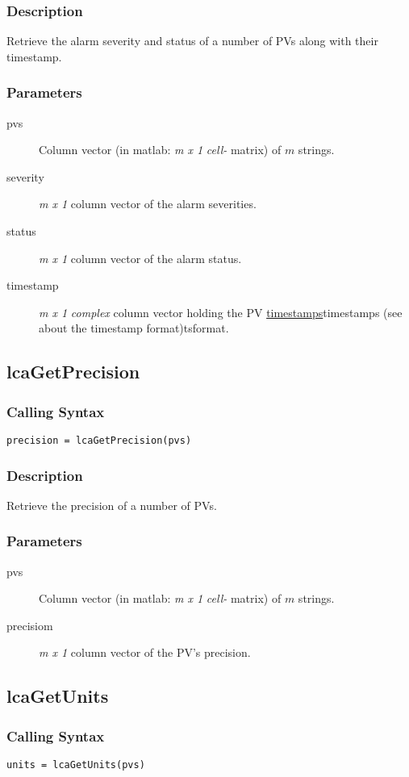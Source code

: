 \documentclass{article}
\newcommand{\pbrk}{\pagebreak[3]}
\newcommand{\ita}[1]{\emph{#1}}
\newcommand{\m}{$m$}
\newcommand{\mhack}{$m$} %
\newcommand{\mxl}{$m\times 1$}
\renewcommand{\m}{\ita{m}}
\newcommand{\mhack}{\ita{m}} %
\renewcommand{\mxl}{\ita{m x 1}}
\renewcommand{\pbrk}{}
\newcommand{\PVITEM}{
\item[pvs] Column vector (in matlab: \mxl{} \ita{cell-} matrix)
of \mhack{} strings.
}
\begin{document}
\subsubsection{Description}
Retrieve the alarm severity and status of a number of PVs along
with their timestamp.
\subsubsection{Parameters}
\begin{description}
\PVITEM
\item[severity] \mxl{} column vector of the alarm severities.
\item[status] \mxl{} column vector of the alarm status.
\item[timestamp] \mxl{} \ita{complex} column vector holding the
PV \hyperref[ref]{timestamps}{timestamps (see }{ about the timestamp format)}{tsformat}.
\end{description}


\vspace*{\fill}
\pbrk
\subsection{lcaGetPrecision}
\subsubsection{Calling Syntax}
\begin{verbatim}
precision = lcaGetPrecision(pvs)
\end{verbatim}
\subsubsection{Description}
Retrieve the precision of a number of PVs.
\subsubsection{Parameters}
\begin{description}
\PVITEM
\item[precisiom] \mxl{} column vector of the PV's precision.
\end{description}

\vspace*{\fill}
\pbrk
\subsection{lcaGetUnits}
\subsubsection{Calling Syntax}
\begin{verbatim}
units = lcaGetUnits(pvs)
\end{verbatim}
\end{document}
